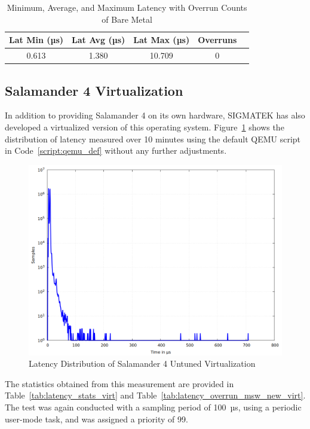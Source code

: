 \documentclass[MMR,Master,english]{style/twbook}
\begin{document}
\begin{table}[H]
	\centering
	\caption[Latency Statistics with Overrun Counts of Bare Metal]{Minimum, Average, and Maximum Latency with Overrun Counts of Bare Metal}
	\label{tab:latency_overrun_msw_hardware}
	\begin{tabular}{|c|c|c|c|c|}
		\hline
		\textbf{Lat Min (µs)} & \textbf{Lat Avg (µs)} & \textbf{Lat Max (µs)} & \textbf{Overruns} \\ \hline
		0.613                 & 1.380                 & 10.709                & 0                 \\ \hline
	\end{tabular}
\end{table}

\subsection{Salamander 4 Virtualization}\label{subsec:salamander4-virtualization}
In addition to providing Salamander 4 on its own hardware, SIGMATEK has also developed a virtualized version of this operating system. Figure~\ref{fig:gnuplot_max_latency_default} shows the distribution of latency measured over 10 minutes using the default QEMU script in Code~\ref{script:qemu_def} without any further adjustments.

\begin{figure}[H]
	\centering
	\includegraphics[width=0.7\columnwidth]{img/implementation/gnuplot_max_latency_default.png}
	\caption[Latency Distribution of Salamander 4 Untuned Virtualization]{Latency Distribution of Salamander 4 Untuned Virtualization}
	\label{fig:gnuplot_max_latency_default}
\end{figure}

\clearpage

\noindent The statistics obtained from this measurement are provided in Table~\ref{tab:latency_stats_virt} and Table~\ref{tab:latency_overrun_msw_new_virt}. The test was again conducted with a sampling period of 100~µs, using a periodic user-mode task, and was assigned a priority of 99.
\end{document}
